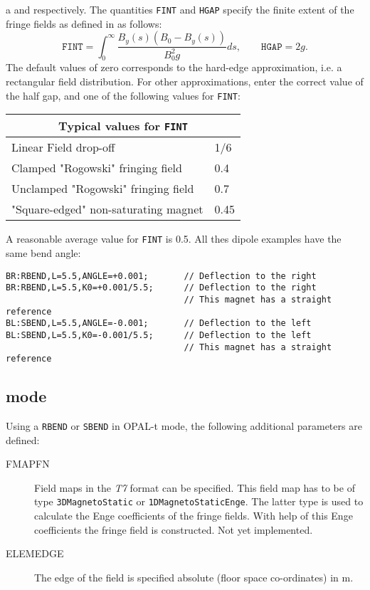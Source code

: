 a  and
 respectively.
The quantities \texttt{FINT} and \texttt{HGAP} specify
the finite extent of the fringe fields as defined in
as follows:
\[
\mathtt{FINT} = \int_0^\infty{\frac{B_y(s) (B_0 - B_y(s))}{B_0^2 g}}ds,\qquad
\mathtt{HGAP} = 2 g.
\]
The default values of zero corresponds to the hard-edge approximation,
i.e. a rectangular field distribution.
For other approximations, enter the correct value of the half gap,
and one of the following values for \texttt{FINT}:
\begin{center}
  \begin{tabular}{|l|l|}
    \hline
    \multicolumn{2}{|c|}{Typical values for \texttt{FINT}} \\
    \hline
    Linear Field drop-off                & 1/6  \\
    Clamped "Rogowski" fringing field    & 0.4  \\
    Unclamped "Rogowski" fringing field  & 0.7  \\
    "Square-edged" non-saturating magnet & 0.45 \\
    \hline
  \end{tabular}
\end{center}
A reasonable average value for \texttt{FINT} is 0.5.
All thes dipole examples have the same bend angle:
\begin{verbatim}
BR:RBEND,L=5.5,ANGLE=+0.001;       // Deflection to the right
BR:RBEND,L=5.5,K0=+0.001/5.5;      // Deflection to the right
                                   // This magnet has a straight reference
BL:SBEND,L=5.5,ANGLE=-0.001;       // Deflection to the left
BL:SBEND,L=5.5,K0=-0.001/5.5;      // Deflection to the left
                                   // This magnet has a straight reference
\end{verbatim}

\subsection{\opalt mode}
\label{sec:quadrupole-t}
Using a \texttt{RBEND} or \texttt{SBEND} in OPAL-t mode, the following additional parameters are defined:
\begin{description}
\item[FMAPFN]
  Field maps in the {\em T7} format can be specified. This field map has to be of type \texttt{3DMagnetoStatic} or \texttt{1DMagnetoStaticEnge}. The latter type is used to calculate the Enge coefficients of the fringe fields. With help of this Enge coefficients the fringe field is constructed. Not yet implemented.
\item[ELEMEDGE]
  The edge of the field is specified absolute (floor space co-ordinates) in m.
  \end{description}


